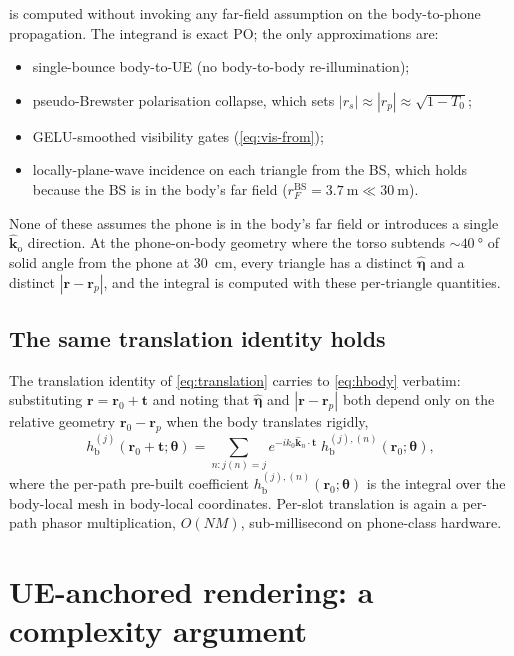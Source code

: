 \documentclass[11pt,a4paper]{article}
\theoremstyle{definition}
\newcommand{\khat}{\hat{\bm{k}}}
\newcommand{\etahat}{\hat{\bm{\eta}}}
\newcommand{\rr}{\mathbf{r}}
\newcommand{\thetab}{\bm{\theta}}
\newcommand{\hbody}{h_{\mathrm{b}}}
\newcommand{\kout}{\hat{\bm{k}}_{\mathrm{o}}}
\begin{document}
 is computed without invoking any far-field
assumption on the body-to-phone propagation.  The integrand is
exact PO; the only approximations are:
\begin{itemize}[leftmargin=1.6em,itemsep=2pt]
\item single-bounce body-to-UE (no body-to-body re-illumination);
\item pseudo-Brewster polarisation collapse, which sets
$|r_s|\approx|r_p|\approx\sqrt{1-T_0}$;
\item GELU-smoothed visibility gates (\cref{eq:vis-from});
\item locally-plane-wave incidence on each triangle from the BS,
which holds because the BS is in the body's far field
($r_F^{\mathrm{BS}}=\SI{3.7}{\m}\ll\SI{30}{\m}$).
\end{itemize}
None of these assumes the phone is in the body's far field or
introduces a single $\kout$ direction.  At the phone-on-body
geometry where the torso subtends $\sim\SI{40}{\degree}$ of solid
angle from the phone at \SI{30}{\cm}, every triangle has a
distinct $\etahat$ and a distinct $|\rr-\rr_p|$, and the integral
is computed with these per-triangle quantities.

\subsection{The same translation identity holds}

The translation identity of \cref{eq:translation} carries to
\cref{eq:hbody} verbatim: substituting
$\rr=\rr_0+\mathbf{t}$ and noting that $\etahat$ and
$|\rr-\rr_p|$ both depend only on the relative geometry
$\rr_0-\rr_p$ when the body translates rigidly,
\begin{equation}\label{eq:hbody-trans}
  \hbody^{(j)}(\rr_0+\mathbf{t};\thetab)
  = \!\!\sum_{n:j(n)=j}\!\!
    e^{-ik_0\khat_n\cdot\mathbf{t}}\;
    \hbody^{(j),(n)}(\rr_0;\thetab),
\end{equation}
where the per-path pre-built coefficient
$\hbody^{(j),(n)}(\rr_0;\thetab)$ is the integral over the
body-local mesh in body-local coordinates.  Per-slot translation
is again a per-path phasor multiplication, $O(N M)$, sub-millisecond
on phone-class hardware.

\section{UE-anchored rendering: a complexity argument}\label{sec:ue-render}
\end{document}
